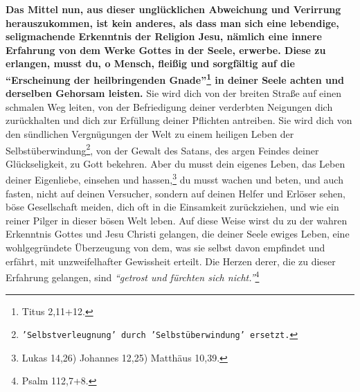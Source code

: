 \textbf{Das Mittel nun, aus dieser unglücklichen Abweichung und Verirrung
herauszukommen,
ist kein anderes, als dass man sich eine lebendige, seligmachende Erkenntnis der
Religion Jesu, nämlich eine innere Erfahrung von dem
Werke Gottes in der Seele,
erwerbe. Diese zu erlangen, musst du, o Mensch, fleißig und sorgfältig auf die
"`Erscheinung der heilbringenden Gnade"'\footnote{Titus 2,11+12.}
in deiner Seele
achten und derselben Gehorsam leisten.} Sie wird dich von der breiten Straße auf
einen schmalen Weg leiten, von der Befriedigung deiner verderbten Neigungen dich
zurückhalten und dich zur Erfüllung deiner Pflichten antreiben.
Sie wird dich
von den sündlichen Vergnügungen der Welt zu einem
heiligen Leben der
Selbstüberwindung\footnote{\texttt{'Selbstverleugnung' durch 'Selbstüberwindung'
ersetzt.}}, von der Gewalt des Satans, des argen Feindes
deiner
Glückseligkeit, zu Gott bekehren. Aber du musst dein
eigenes Leben, das Leben
deiner Eigenliebe, einsehen und hassen,\footnote{Lukas
14,26) Johannes 12,25) Matthäus 10,39.}
du musst wachen und beten, und auch fasten, nicht auf
deinen Versucher,
sondern auf deinen Helfer und Erlöser sehen, böse
Gesellschaft meiden, dich oft
in die Einsamkeit zurückziehen, und wie ein reiner
Pilger in dieser bösen Welt
leben. Auf diese Weise wirst du zu der wahren Erkenntnis
Gottes und Jesu Christi
gelangen, die deiner Seele ewiges Leben, eine wohlgegründete
Überzeugung von
dem, was sie selbst davon empfindet und erfährt, mit unzweifelhafter Gewissheit
erteilt. Die Herzen derer, die zu dieser Erfahrung gelangen, sind
\textit{"`getrost und fürchten sich nicht."'}\footnote{Psalm 112,7+8.}



